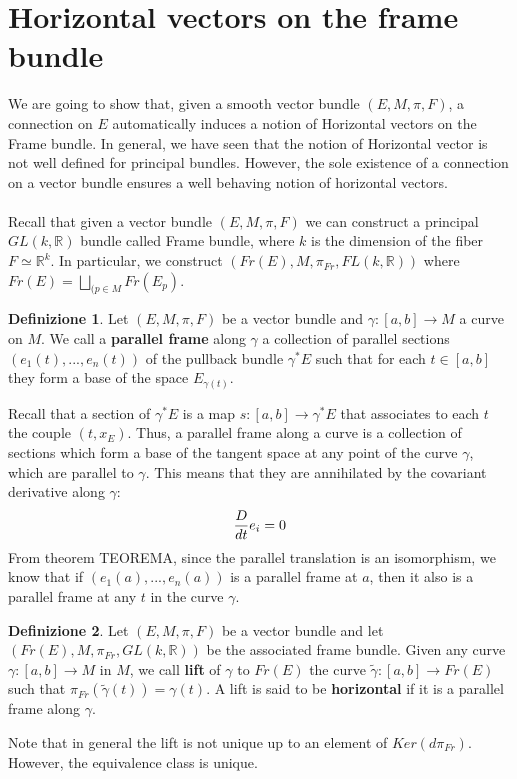\documentclass[12pt,a4paper]{report}
\theoremstyle{definition}
\newtheorem{Def}{Definizione}[chapter]
\theoremstyle{Theorem}
\theoremstyle{definition}
\theoremstyle{definition}
\theoremstyle{definition}
\begin{document}
		\section{Horizontal vectors on the frame bundle}
			We are going to show that, given a smooth vector bundle $(E,M,\pi,F)$, a connection on $E$ automatically induces a notion of Horizontal vectors on the Frame bundle. In general, we have seen that the notion of Horizontal vector is not well defined for principal bundles. However, the sole existence of a connection on a vector bundle ensures a well behaving notion of horizontal vectors.\\
			\\
			Recall that given a vector bundle $(E,M,\pi,F)$ we can construct a principal $GL(k, \mathbb{R})$ bundle called Frame bundle, where $k$ is the dimension of the fiber $F\simeq\mathbb{R}^k$. In particular, we construct $(Fr(E),M,\pi_{Fr},FL(k,\mathbb{R}))$ where $Fr(E)=\bigsqcup_{(p\in M}Fr(E_p)$.
			\begin{Def}
				Let $(E,M,\pi,F)$ be a vector bundle and $\gamma:[a,b]\rightarrow M$ a curve on $M$. We call a \textbf{parallel frame} along $\gamma$ a collection of parallel sections $(e_1(t),...,e_n(t))$ of the pullback bundle $\gamma^*E$ such that for each $t\in[a,b]$ they form a base of the space $E_{\gamma(t)}$.
			\end{Def}
			Recall that a section of $\gamma^*E$ is a map $s:[a,b]\rightarrow \gamma^*E$ that associates to each $t$ the couple $(t,x_E)$. Thus, a parallel frame along a curve is a collection of sections which form a base of the tangent space at any point of the curve $\gamma$, which are parallel to $\gamma$. This means that they are annihilated by the covariant derivative along $\gamma$:
			$${D\over dt}e_i=0$$
			From theorem TEOREMA, since the parallel translation is an isomorphism, we know that if $(e_1(a),...,e_n(a))$ is a parallel frame at $a$, then it also is a parallel frame at any $t$ in the curve $\gamma$.
			\begin{Def}
				Let $(E,M,\pi,F)$ be a vector bundle and let $(Fr(E),M,\pi_{Fr},GL(k,\mathbb{R}))$ be the associated frame bundle. Given any curve $\gamma:[a,b]\rightarrow M$ in $M$, we call \textbf{lift} of $\gamma$ to $Fr(E)$ the curve $\tilde{\gamma}:[a,b]\rightarrow Fr(E)$ such that $\pi_{Fr}(\tilde{\gamma}(t))=\gamma(t)$. A lift is said to be \textbf{horizontal} if it is a parallel frame along $\gamma$.
			\end{Def}
			Note that in general the lift is not unique up to an element of $Ker(d\pi_{Fr})$. However, the equivalence class is unique.
\end{document}
